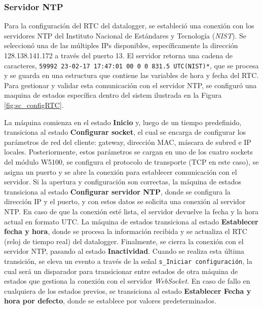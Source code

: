 \subsubsection{Servidor NTP}\label{sec:serverNTP}
Para la configuración del RTC del datalogger, se estableció una conexión con los servidores NTP del Instituto Nacional de Estándares y Tecnología (\textit{NIST}). Se seleccionó una de las múltiples IPs disponibles, específicamente la dirección 128.138.141.172 a través del puerto 13. El servidor retorna una cadena de caracteres, \texttt{59992 23-02-17 17:47:01 00 0 0 831.5 UTC(NIST)*}, que se procesa y se guarda en una estructura que contiene las variables de hora y fecha del RTC. Para gestionar y validar esta comunicación con el servidor NTP, se configuró una maquina de estados específica dentro del sistem ilustrada en la Figura \ref{fig:sc_configRTC}.




La máquina comienza en el estado \textbf{Inicio} y, luego de un tiempo predefinido, transiciona al estado \textbf{Configurar socket}, el cual se encarga de configurar los parámetros de red del cliente: gateway, dirección MAC, máscara de subred e IP locales. Posteriormente, estos parámetros se cargan en uno de los cuatro sockets del módulo W5100, se configura el protocolo de transporte (TCP en este caso), se asigna un puerto y se abre la conexión para establecer comunicación con el servidor. Si la apertura y configuración son correctas, la máquina de estados transiciona al estado \textbf{Configurar servidor NTP}, donde se configura la dirección IP y el puerto, y con estos datos se solicita una conexión al servidor NTP. En caso de que la conexión esté lista, el servidor devuelve la fecha y la hora actual en formato UTC. La máquina de estados transiciona al estado \textbf{Establecer fecha y hora}, donde se procesa la información recibida y se actualiza el RTC (reloj de tiempo real) del datalogger. Finalmente, se cierra la conexión con el servidor NTP, pasando al estado \textbf{Inactividad}. Cuando se realiza esta última transición, se eleva un evento a través de la señal \texttt{s\_Iniciar configuración}, la cual será un disparador para transicionar entre estados de otra máquina de estados que gestiona la conexión con el servidor \textit{WebSocket}. En caso de fallo en cualquiera de los estados previos, se transiciona al estado \textbf{Establecer Fecha y hora por defecto}, donde se establece por valores predeterminados.

